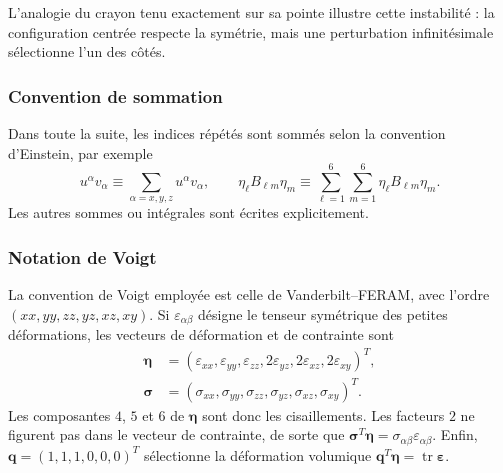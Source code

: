 L'analogie du crayon tenu exactement sur sa pointe illustre cette instabilité :
la configuration centrée respecte la symétrie, mais une perturbation
infinitésimale sélectionne l'un des côtés.

\subsubsection{Convention de sommation}
Dans toute la suite, les indices répétés sont sommés selon la convention
d'Einstein, par exemple
\[
u^\alpha v_\alpha
\equiv\sum_{\alpha=x,y,z}u^\alpha v_\alpha,
\qquad
\eta_\ell B_{\ell m}\eta_m
\equiv\sum_{\ell=1}^{6}\sum_{m=1}^{6}
\eta_\ell B_{\ell m}\eta_m.
\]
Les autres sommes ou intégrales sont écrites explicitement.

\subsubsection{Notation de Voigt}
La convention de Voigt employée est celle de Vanderbilt--FERAM, avec l'ordre
$(xx,yy,zz,yz,xz,xy)$. Si $\varepsilon_{\alpha\beta}$ désigne le tenseur
symétrique des petites déformations, les vecteurs de déformation et de
contrainte sont
\begin{equation}
\begin{aligned}
\boldsymbol\eta
&=(\varepsilon_{xx},\varepsilon_{yy},\varepsilon_{zz},
2\varepsilon_{yz},2\varepsilon_{xz},2\varepsilon_{xy})^T,\\
\boldsymbol\sigma
&=(\sigma_{xx},\sigma_{yy},\sigma_{zz},
\sigma_{yz},\sigma_{xz},\sigma_{xy})^T.
\end{aligned}
\label{eq:core_voigt_convention}
\end{equation}
Les composantes $4$, $5$ et $6$ de $\boldsymbol\eta$ sont donc les
cisaillements. Les facteurs $2$ ne figurent pas dans le vecteur de
contrainte, de sorte que
$\boldsymbol\sigma^T\boldsymbol\eta
=\sigma_{\alpha\beta}\varepsilon_{\alpha\beta}$.
Enfin, $\mathbf q=(1,1,1,0,0,0)^T$ sélectionne la déformation volumique
$\mathbf q^T\boldsymbol\eta=\operatorname{tr}\boldsymbol\varepsilon$.

